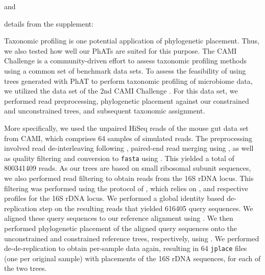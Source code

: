  and 

details from the supplement:

Taxonomic profiling is one potential application of phylogenetic placement.
Thus, we also tested how well our \acp{PhAT} are suited for this purpose.
The CAMI Challenge \citep{Sczyrba2017} is a community-driven effort to assess taxonomic profiling methods
using a common set of benchmark data sets.
To assess the feasibility of using trees generated with \ac{PhAT} to perform taxonomic profiling of microbiome data,
we utilized the  data set of the 2nd CAMI Challenge \citep{Bremges2018}.
For this data set, we performed read preprocessing, phylogenetic placement
against our constrained and unconstrained  trees,
and subsequent taxonomic assignment.

More specifically, we used the unpaired HiSeq reads of the mouse gut data set from CAMI,
which comprises \num{64} samples of simulated reads.
The preprocessing involved read de-interleaving following \cite{DeinterleaveFastq},
paired-end read merging using  \citep{Zhang2014},
as well as quality filtering and conversion to \texttt{fasta} using  \citep{Rognes2016}.
This yielded a total of \num{800 341 409} reads.
As our trees are based on small ribosomal subunit sequences,
we also performed read filtering to obtain reads from the 16S rDNA locus.
This filtering was performed using the protocol of \cite{Logares2014},
which relies on  \citep{Eddy1998,Eddy2009}, and respective profiles for the 16S rDNA locus.
We performed a global identity based de-replication step on the resulting reads that yielded \num{616 405} query sequences.
We aligned these query sequences to our  reference alignment
using  \citep{Berger2011a,Berger2012}.
We then performed phylogenetic placement of the aligned query sequences onto the unconstrained and constrained reference trees,
respectively, using  \citep{Barbera2018}.
We performed de-de-replication to obtain per-sample data again, %
resulting in \num{64} \texttt{jplace} files (one per original sample) with placements of the 16S rDNA sequences,
for each of the two trees.

